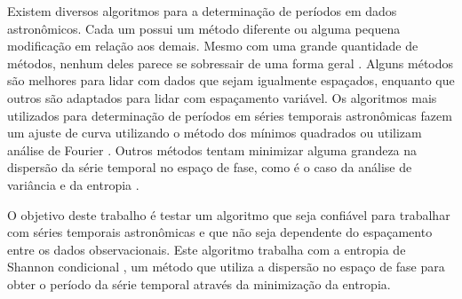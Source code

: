 Existem diversos algoritmos para a determinação de períodos em dados astronômicos. Cada um possui um método diferente ou alguma pequena modificação em relação aos demais. Mesmo com uma grande quantidade de métodos, nenhum deles parece se sobressair de uma forma geral \citep{comparison}. Alguns métodos são melhores para lidar com dados que sejam igualmente espaçados, enquanto que outros são adaptados para lidar com espaçamento variável. Os algoritmos mais utilizados para determinação de períodos em séries temporais astronômicas fazem um ajuste de curva utilizando o método dos mínimos quadrados \citep{lomb} ou utilizam análise de Fourier \citep{mello81}. Outros métodos tentam minimizar alguma grandeza na dispersão da série temporal no espa\c{c}o de fase, como é o caso da análise de variância \citep{aov} e da entropia \citep{entropy}.



O objetivo deste trabalho é testar um algoritmo que seja confiável para trabalhar com séries temporais astronômicas e que não seja dependente do espaçamento entre os dados observacionais. Este algoritmo trabalha com a entropia de Shannon condicional \citep{ce, Cincotta1999}, um método que utiliza a dispersão no espaço de fase para obter o período da série temporal através da minimização da entropia.



